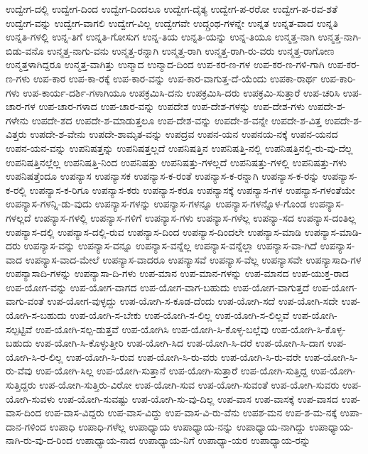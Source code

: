 {ಉದ್ವೇಗ-ದಲ್ಲಿ
ಉದ್ವೇಗ-ದಿಂದ
ಉದ್ವೇಗ-ದಿಂದಲೂ
ಉದ್ವೇಗ-ದೈತ್ಯ
ಉದ್ವೇಗ-ಪ-ರರೋ
ಉದ್ವೇಗ-ಪ-ರವ-ಶತೆ
ಉದ್ವೇಗ-ವನ್ನು
ಉದ್ವೇಗ-ವಾಗಲಿ
ಉದ್ವೇಗ-ವಿಲ್ಲ
ಉದ್ವೇಗವೇ
ಉದ್ಗ್ರಂಥ-ಗಳನ್ನೇ
ಉನ್ನತ
ಉನ್ನತ-ವಾದ
ಉನ್ನತಿ
ಉನ್ನತಿ-ಗಳಲ್ಲಿ
ಉನ್ನ-ತಿಗೆ
ಉನ್ನತಿ-ಗೋಸುಗ
ಉನ್ನ-ತಿಯ
ಉನ್ನತಿ-ಯನ್ನು
ಉನ್ನ-ತಿಯೂ
ಉನ್ಮತ್ತ-ನಾಗಿ
ಉನ್ಮತ್ತ-ನಾಗಿ-ಬಿಡು-ವನೊ
ಉನ್ಮತ್ತ-ನಾಗು-ವನು
ಉನ್ಮತ್ತ-ರನ್ನಾಗಿ
ಉನ್ಮತ್ತ-ರಾಗಿ
ಉನ್ಮತ್ತ-ರಾಗಿ-ರು-ವರು
ಉನ್ಮತ್ತ-ರಾಗೋಣ
ಉನ್ಮತ್ತಳಾಗಿದ್ದರೂ
ಉನ್ಮತ್ತ-ವಾಗಿತ್ತು
ಉನ್ಮಾದ
ಉನ್ಮಾದ-ದಿಂದ
ಉಪ-ಕರ-ಣ-ಗಳ
ಉಪ-ಕರ-ಣ-ಗಳಿ-ಗಾಗಿ
ಉಪ-ಕರ-ಣ-ಗಳು
ಉಪ-ಕಾರ
ಉಪ-ಕಾ-ರಕ್ಕೆ
ಉಪ-ಕಾರ-ವನ್ನು
ಉಪ-ಕಾರ-ವಾಗುತ್ತ-ದೆ-ಯೆಂದು
ಉಪಕಾ-ರಾರ್ಥ
ಉಪ-ಕಾರಿ-ಗಳು
ಉಪ-ಕಾರ್ಯ-ದರ್ಶಿ-ಗಳಾಗಿಯೂ
ಉಪಕ್ರಮಿಸಿ-ದನು
ಉಪಕ್ರಮಿಸಿ-ದರು
ಉಪಕ್ರಮಿ-ಸುತ್ತಾರೆ
ಉಪ-ಚರಿಸಿ
ಉಪ-ಚಾರ-ಗಳ
ಉಪ-ಚಾರ-ಗಳಾದ
ಉಪ-ಚಾರ-ವನ್ನು
ಉಪದೇಶ
ಉಪ-ದೇಶ-ಗಳನ್ನು
ಉಪ-ದೇಶ-ಗಳು
ಉಪದೇ-ಶ-ಗಳೇನು
ಉಪದೇ-ಶದ
ಉಪದೇ-ಶ-ಮಾಡುತ್ತಲೂ
ಉಪ-ದೇಶ-ವನ್ನು
ಉಪದೇ-ಶ-ವನ್ನೇ
ಉಪದೇ-ಶ-ವಿತ್ತ
ಉಪದೇ-ಶ-ವಿತ್ತರು
ಉಪದೇ-ಶ-ವೇನು
ಉಪದೇ-ಶಾಮೃತ-ವನ್ನು
ಉಪದ್ರವ
ಉಪನ-ಯನ
ಉಪನಯ-ನಕ್ಕೆ
ಉಪನ-ಯನದ
ಉಪನ-ಯನ-ವನ್ನು
ಉಪನಿಷತ್ತನ್ನು
ಉಪನಿಷತ್ತಲ್ಲದೆ
ಉಪನಿಷತ್ತಿನ
ಉಪನಿಷತ್ತಿ-ನಲ್ಲಿ
ಉಪನಿಷತ್ತಿನಲ್ಲಿ-ರು-ವು-ದೆಲ್ಲ
ಉಪನಿಷತ್ತಿನಲ್ಲೆಲ್ಲ
ಉಪನಿಷತ್ತಿ-ನಿಂದ
ಉಪನಿಷತ್ತು
ಉಪನಿಷತ್ತು-ಗಳಲ್ಲದೆ
ಉಪನಿಷತ್ತು-ಗಳಲ್ಲಿ
ಉಪನಿಷತ್ತು-ಗಳು
ಉಪನಿಷತ್ತೆಂದೂ
ಉಪನ್ಯಾಸ
ಉಪನ್ಯಾಸಕ
ಉಪನ್ಯಾಸ-ಕ-ರಂತೆ
ಉಪನ್ಯಾಸ-ಕ-ರನ್ನಾಗಿ
ಉಪನ್ಯಾಸ-ಕ-ರನ್ನು
ಉಪನ್ಯಾಸ-ಕ-ರಲ್ಲಿ
ಉಪನ್ಯಾಸ-ಕ-ರಿಗೂ
ಉಪನ್ಯಾಸ-ಕರು
ಉಪನ್ಯಾಸ-ಕರೂ
ಉಪನ್ಯಾಸಕ್ಕೆ
ಉಪನ್ಯಾಸ-ಗಳ
ಉಪನ್ಯಾಸ-ಗಳಂತೆಯೇ
ಉಪನ್ಯಾಸ-ಗಳನ್ನಿ-ಡು-ವುದು
ಉಪನ್ಯಾಸ-ಗಳನ್ನು
ಉಪನ್ಯಾಸ-ಗಳನ್ನೂ
ಉಪನ್ಯಾಸ-ಗಳನ್ನೊಳ-ಗೊಂಡ
ಉಪನ್ಯಾಸ-ಗಳಲ್ಲದೆ
ಉಪನ್ಯಾಸ-ಗಳಲ್ಲಿ
ಉಪನ್ಯಾಸ-ಗಳಿಗೆ
ಉಪನ್ಯಾಸ-ಗಳು
ಉಪನ್ಯಾಸ-ಗಳೆಲ್ಲ
ಉಪನ್ಯಾ-ಸದ
ಉಪನ್ಯಾಸ-ದಂತಿಲ್ಲ
ಉಪನ್ಯಾಸ-ದಲ್ಲಿ
ಉಪನ್ಯಾಸ-ದಲ್ಲಿ-ರುವ
ಉಪನ್ಯಾಸ-ದಿಂದ
ಉಪನ್ಯಾಸ-ದಿಂದಲೇ
ಉಪನ್ಯಾಸ-ಮಾಡಿ
ಉಪನ್ಯಾಸ-ಮಾಡಿ-ದರು
ಉಪನ್ಯಾಸ-ವನ್ನು
ಉಪನ್ಯಾಸ-ವನ್ನೂ
ಉಪನ್ಯಾಸ-ವನ್ನೆಲ್ಲ
ಉಪನ್ಯಾಸ-ವನ್ನೆಲ್ಲಾ
ಉಪನ್ಯಾಸ-ವಾ-ಗಿದೆ
ಉಪನ್ಯಾಸ-ವಾದ
ಉಪನ್ಯಾಸ-ವಾದ-ಮೇಲೆ
ಉಪನ್ಯಾಸ-ವಾದರೂ
ಉಪನ್ಯಾಸವೆ
ಉಪನ್ಯಾಸ-ವೆಲ್ಲ
ಉಪನ್ಯಾಸವೇ
ಉಪನ್ಯಾಸಾದಿ-ಗಳ
ಉಪನ್ಯಾಸಾದಿ-ಗಳನ್ನು
ಉಪನ್ಯಾಸಾ-ದಿ-ಗಳು
ಉಪ-ಮಾನ
ಉಪ-ಮಾನ-ಗಳನ್ನು
ಉಪ-ಮಾನದ
ಉಪ-ಯುಕ್ತ-ರಾದ
ಉಪ-ಯೋಗ-ವನ್ನು
ಉಪ-ಯೋಗ-ವಾಗದ
ಉಪ-ಯೋಗ-ವಾಗ-ಬಹುದು
ಉಪ-ಯೋಗ-ವಾಗುತ್ತದೆ
ಉಪ-ಯೋಗ-ವಾಗು-ವಂತೆ
ಉಪ-ಯೋಗ-ವುಳ್ಳದ್ದು
ಉಪ-ಯೋಗಿ-ಸ-ಕೂಡ-ದೆಂದು
ಉಪ-ಯೋಗಿ-ಸದೆ
ಉಪ-ಯೋಗಿ-ಸದೇ
ಉಪ-ಯೋಗಿ-ಸ-ಬಹುದು
ಉಪ-ಯೋಗಿ-ಸ-ಬೇಕು
ಉಪ-ಯೋಗಿ-ಸ-ಲಿಲ್ಲ
ಉಪ-ಯೋಗಿ-ಸ-ಲಿಲ್ಲವೆ
ಉಪ-ಯೋಗಿ-ಸಲ್ಪಟ್ಟಿವೆ
ಉಪ-ಯೋಗಿ-ಸಲ್ಪ-ಡುತ್ತವೆ
ಉಪ-ಯೋಗಿಸಿ
ಉಪ-ಯೋಗಿ-ಸಿ-ಕೊಳ್ಳ-ಬಲ್ಲೆವು
ಉಪ-ಯೋಗಿ-ಸಿ-ಕೊಳ್ಳ-ಬಹುದು
ಉಪ-ಯೋಗಿ-ಸಿ-ಕೊಳ್ಳುತ್ತೀರಿ
ಉಪ-ಯೋಗಿ-ಸಿದ
ಉಪ-ಯೋಗಿ-ಸಿ-ದರೆ
ಉಪ-ಯೋಗಿ-ಸಿ-ದಾಗ
ಉಪ-ಯೋಗಿ-ಸಿ-ರ-ಲಿಲ್ಲ
ಉಪ-ಯೋಗಿ-ಸಿ-ರುವ
ಉಪ-ಯೋಗಿ-ಸಿ-ರು-ವರು
ಉಪ-ಯೋಗಿ-ಸಿ-ರು-ವರೇ
ಉಪ-ಯೋಗಿ-ಸಿ-ರು-ವೆವು
ಉಪ-ಯೋಗಿ-ಸಿಲ್ಲ
ಉಪ-ಯೋಗಿ-ಸುತ್ತಾನೆ
ಉಪ-ಯೋಗಿ-ಸುತ್ತಾರೆ
ಉಪ-ಯೋಗಿ-ಸುತ್ತಿದ್ದ
ಉಪ-ಯೋಗಿ-ಸುತ್ತಿದ್ದರು
ಉಪ-ಯೋಗಿ-ಸುತ್ತಿರು-ವಿರೋ
ಉಪ-ಯೋಗಿ-ಸುವ
ಉಪ-ಯೋಗಿ-ಸುವಂತೆ
ಉಪ-ಯೋಗಿ-ಸುವರು
ಉಪ-ಯೋಗಿ-ಸುವಳು
ಉಪ-ಯೋಗಿ-ಸುವಷ್ಟು
ಉಪ-ಯೋಗಿ-ಸು-ವು-ದಿಲ್ಲ
ಉಪ-ವಾಸ
ಉಪ-ವಾಸಕ್ಕೆ
ಉಪ-ವಾಸದ
ಉಪ-ವಾಸ-ದಿಂದ
ಉಪ-ವಾಸ-ವಿದ್ದರು
ಉಪ-ವಾಸ-ವಿದ್ದು
ಉಪ-ವಾಸ-ವಿ-ರು-ವೆನು
ಉಪಶ-ಮನ
ಉಪ-ಶ-ಮ-ನಕ್ಕೆ
ಉಪಾ-ದಾನ-ಗಳಿಂದ
ಉಪಾಧಿ
ಉಪಾಧಿ-ಗಳೆಲ್ಲ
ಉಪಾಧ್ಯಾಯ
ಉಪಾಧ್ಯಾಯ-ನನ್ನು
ಉಪಾಧ್ಯಾಯ-ನಾಗಿದ್ದು
ಉಪಾಧ್ಯಾಯ-ನಾಗಿ-ರು-ವು-ದ-ರಿಂದ
ಉಪಾಧ್ಯಾಯ-ನಾದ
ಉಪಾಧ್ಯಾಯ-ನಿಗೆ
ಉಪಾಧ್ಯಾ-ಯರ
ಉಪಾಧ್ಯಾಯ-ರನ್ನು
}
